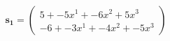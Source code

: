\documentclass[preview]{standalone}
\begin{document}
\begin{align*}
\mathbf{s_1} = \begin{pmatrix}5 + -5x^{1} + -6x^{2} + 5x^{3} \\ -6 + -3x^{1} + -4x^{2} + -5x^{3}\end{pmatrix}
\end{align*}
\end{document}
